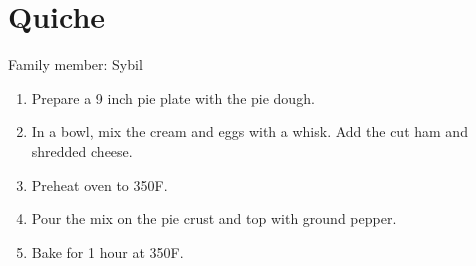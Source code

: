 \chapter{Quiche}
\label{ch:hamquiche}

Family member: Sybil



\begin{enumerate}
    \item Prepare a 9 inch pie plate with the pie dough.
    \item In a bowl, mix the cream and eggs with a whisk. Add the cut ham and shredded cheese.
    \item Preheat oven to 350\degree F.
    \item Pour the mix on the pie crust and top with ground pepper.
    \item Bake for 1 hour at 350\degree F.
\end{enumerate}

